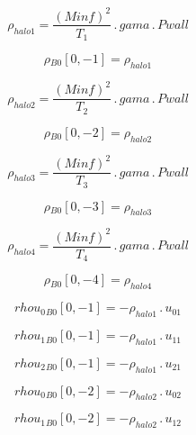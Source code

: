 \documentclass{article}
\begin{document}
\begin{dmath}\rho_{halo 1} = \frac{\left(Minf \right)^{2}}{T_{1}} \,.\, gama \,.\, Pwall\end{dmath}

\begin{dmath}{\rho{_{B0}}}[{0,-1}] = \rho_{halo 1}\end{dmath}

\begin{dmath}\rho_{halo 2} = \frac{\left(Minf \right)^{2}}{T_{2}} \,.\, gama \,.\, Pwall\end{dmath}

\begin{dmath}{\rho{_{B0}}}[{0,-2}] = \rho_{halo 2}\end{dmath}

\begin{dmath}\rho_{halo 3} = \frac{\left(Minf \right)^{2}}{T_{3}} \,.\, gama \,.\, Pwall\end{dmath}

\begin{dmath}{\rho{_{B0}}}[{0,-3}] = \rho_{halo 3}\end{dmath}

\begin{dmath}\rho_{halo 4} = \frac{\left(Minf \right)^{2}}{T_{4}} \,.\, gama \,.\, Pwall\end{dmath}

\begin{dmath}{\rho{_{B0}}}[{0,-4}] = \rho_{halo 4}\end{dmath}

\begin{dmath}{rhou_{0}{_{B0}}}[{0,-1}] = - \rho_{halo 1} \,.\, u_{01}\end{dmath}

\begin{dmath}{rhou_{1}{_{B0}}}[{0,-1}] = - \rho_{halo 1} \,.\, u_{11}\end{dmath}

\begin{dmath}{rhou_{2}{_{B0}}}[{0,-1}] = - \rho_{halo 1} \,.\, u_{21}\end{dmath}

\begin{dmath}{rhou_{0}{_{B0}}}[{0,-2}] = - \rho_{halo 2} \,.\, u_{02}\end{dmath}

\begin{dmath}{rhou_{1}{_{B0}}}[{0,-2}] = - \rho_{halo 2} \,.\, u_{12}\end{dmath}
\end{document}

